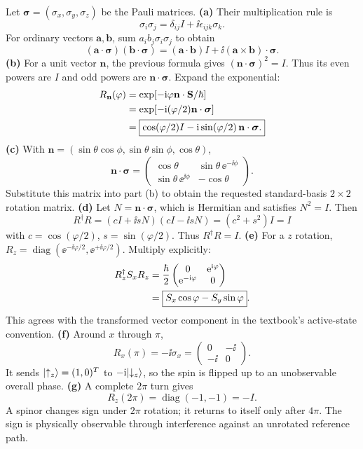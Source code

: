 Let $\boldsymbol\sigma=(\sigma_x,\sigma_y,\sigma_z)$
be the Pauli matrices.
\textbf{(a)} Their multiplication rule is
\[
\sigma_i\sigma_j=\delta_{ij}I+
\ii\epsilon_{ijk}\sigma_k.
\]
For ordinary vectors $\mathbf a,\mathbf b$,
sum $a_ib_j\sigma_i\sigma_j$ to obtain
\begin{equation}
\boxed{(\mathbf a\cdot\boldsymbol\sigma)
(\mathbf b\cdot\boldsymbol\sigma)
=(\mathbf a\cdot\mathbf b)I+
\ii(\mathbf a\times\mathbf b)\cdot\boldsymbol\sigma.}
\end{equation}
\textbf{(b)} For a unit vector $\mathbf n$,
the previous formula gives
$(\mathbf n\cdot\boldsymbol\sigma)^2=I$.
Thus its even powers are $I$ and odd
powers are $\mathbf n\cdot\boldsymbol\sigma$.
Expand the exponential:
\begin{align}
R_{\mathbf n}(\varphi)
&=\exp[-\mathrm i\varphi
\mathbf n\cdot\mathbf S/\hbar]\\
&=\exp[-\mathrm i(\varphi/2)
\mathbf n\cdot\boldsymbol\sigma]\\
&=\boxed{\cos(\varphi/2)I-
\mathrm i\sin(\varphi/2)
\,\mathbf n\cdot\boldsymbol\sigma.}
\end{align}
\textbf{(c)} With
$\mathbf n=(\sin\theta\cos\phi,
\sin\theta\sin\phi,\cos\theta)$,
\[
\mathbf n\cdot\boldsymbol\sigma=
\begin{pmatrix}
\cos\theta&\sin\theta\,\ee^{-\ii\phi}\\
\sin\theta\,\ee^{\ii\phi}&-\cos\theta
\end{pmatrix}.
\]
Substitute this matrix into part (b)
to obtain the requested standard-basis
$2\times2$ rotation matrix.
\textbf{(d)} Let $N=\mathbf n\cdot\boldsymbol\sigma$,
which is Hermitian and satisfies $N^2=I$.
Then
\[
R^\dagger R=(cI+\ii sN)(cI-\ii sN)
=(c^2+s^2)I=I
\]
with $c=\cos(\varphi/2)$,
$s=\sin(\varphi/2)$.
Thus $\boxed{R^\dagger R=I}$.
\textbf{(e)} For a $z$ rotation,
$R_z=\operatorname{diag}(\ee^{-\ii\varphi/2},
\ee^{+\ii\varphi/2})$. Multiply explicitly:
\begin{align}
R_z^\dagger S_xR_z
&=\frac{\hbar}{2}
\begin{pmatrix}0&\mathrm e^{\mathrm i\varphi}\\
\mathrm e^{-\mathrm i\varphi}&0\end{pmatrix}\\
&=\boxed{S_x\cos\varphi-S_y\sin\varphi}.
\end{align}
This agrees with the transformed
vector component in the textbook's
active-state convention.
\textbf{(f)} Around $x$ through $\pi$,
\[
\boxed{R_x(\pi)=-\ii\sigma_x=
\begin{pmatrix}0&-\ii\\-\ii&0\end{pmatrix}.}
\]
It sends $\lvert \uparrow_z\rangle=(1,0)^T$
to $-\mathrm i\lvert \downarrow_z\rangle$, so the
spin is flipped up to an
unobservable overall phase.
\textbf{(g)} A complete $2\pi$ turn gives
\begin{equation}
\boxed{R_z(2\pi)=
\operatorname{diag}(-1,-1)=-I.}
\end{equation}
A spinor changes sign under $2\pi$
rotation; it returns to itself only
after $4\pi$. The sign is physically
observable through interference
against an unrotated reference path.

